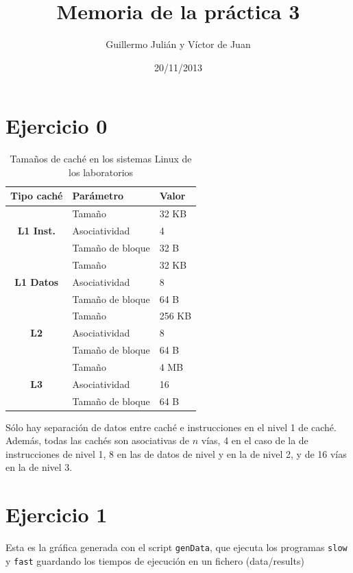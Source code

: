 \documentclass[nochap]{apuntes}
\title{Memoria de la práctica 3}
\author{Guillermo Julián y Víctor de Juan}
\date{20/11/2013}
\begin{document}
\pagestyle{plain}
\maketitle

\section*{Ejercicio 0}

\begin{table}[htbp]
\centering
\begin{tabular}{|c|l|l|}
\hline \textbf{Tipo caché} & \textbf{Parámetro} & \textbf{Valor}  \\ 
\hline \multirow{3}{*}{\textbf{L1 Inst.}} 	& Tamaño  			& 32 KB  \\ 
\cline{2-3}  								& Asociatividad 	& 4  \\ 
\cline{2-3}  								& Tamaño de bloque  & 32 B  \\ 
\hline \multirow{3}{*}{\textbf{L1 Datos}} 	& Tamaño  			& 32 KB  \\ 
\cline{2-3}  								& Asociatividad 	& 8  \\ 
\cline{2-3}  								& Tamaño de bloque  & 64 B  \\ 
\hline \multirow{3}{*}{\textbf{L2}}		 	& Tamaño  			& 256 KB  \\ 
\cline{2-3}  								& Asociatividad 	& 8  \\ 
\cline{2-3}  								& Tamaño de bloque  & 64 B  \\ 
\hline \multirow{3}{*}{\textbf{L3}}		 	& Tamaño  			& 4 MB  \\ 
\cline{2-3}  								& Asociatividad 	& 16 \\ 
\cline{2-3}  								& Tamaño de bloque  & 64 B  \\ 
\hline 
\end{tabular} 
\caption{Tamaños de caché en los sistemas Linux de los laboratorios}
\end{table}

Sólo hay separación de datos entre caché e instrucciones en el nivel 1 de caché. Además, todas las cachés son asociativas de $n$ vías, 4 en el caso de la de instrucciones de nivel 1, 8 en las de datos de nivel y en la de nivel 2, y de 16 vías en la de nivel 3.

\section*{Ejercicio 1}

Esta es la gráfica generada con el script \texttt{genData}, que ejecuta los programas \texttt{slow} y \texttt{fast} guardando los tiempos de ejecución en un fichero (data/results)
\end{document}
